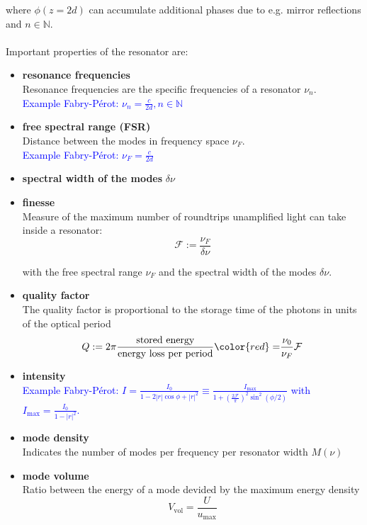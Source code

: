 \documentclass{article}
\newcommand{\lr}[1]{\left(#1\right)}
\begin{document}
where $\phi(z=2d)$ can accumulate additional phases due to e.g. mirror reflections and $n\in\mathbb{N}$.\\
\\
Important properties of the resonator are:
	\begin{itemize}
		\item \textbf{resonance frequencies}\\
		Resonance frequencies are the specific frequencies of a resonator $\nu_n$.\\
		\textcolor{blue}{Example Fabry-Pérot: $\nu_n = \frac{c}{2d}, n\in\mathbb{N}$}

	
		\item \textbf{free spectral range (FSR)}\\
		Distance between the modes in frequency space $\nu_F$.\\
		\textcolor{blue}{Example Fabry-Pérot: $\nu_F = \frac{c}{2d}$}


		\item \textbf{spectral width of the modes} $\delta\nu$


		\item \textbf{finesse}\\
		Measure of the maximum number of roundtrips unamplified light can take inside a resonator:
			\begin{equation}
				\mathcal{F} := \frac{\nu_F}{ \delta\nu }
			\end{equation}
		
		with the free spectral range $\nu_F$ and the spectral width of the modes $\delta\nu$.


		\item \textbf{quality factor}\\
		The quality factor is proportional to the storage time of the photons in units of the optical period
			\begin{equation}
				Q := 2\pi \frac{\text{stored energy}}{\text{energy loss per period}} {\color{red}=} \frac{\nu_0}{\nu_F} \mathcal{F}
			\end{equation}


		\item \textbf{intensity}\\
		\textcolor{blue}{Example Fabry-Pérot: $I = \frac{I_0}{1 - 2|r|\cos\phi + |r|^2} \equiv \frac{I_\text{max}}{1 + \lr{ \frac{2\mathcal{F}}{\pi} }^2 \sin^2(\phi/2)}$ with $I_\text{max} = \frac{I_0}{1 - |r|^2}$.}


		\item \textbf{mode density}\\
		Indicates the number of modes per frequency per resonator width $M(\nu)$


		\item \textbf{mode volume}\\
		Ratio between the energy of a mode devided by the maximum energy density
			\begin{equation}
				V_\text{vol} = \frac{U}{u_\text{max}}
			\end{equation}
	\end{itemize}
\end{document}
